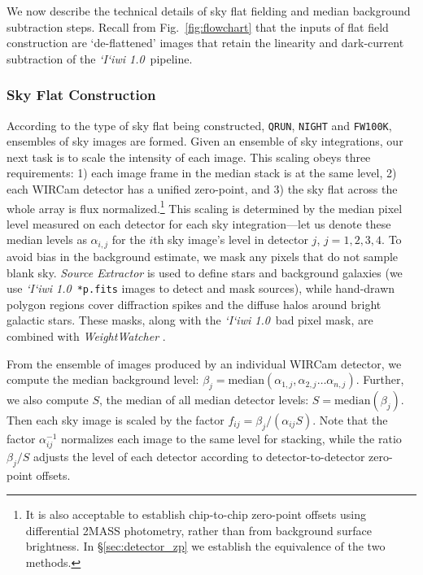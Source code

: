 \documentclass[iop]{emulateapj}
\newcommand{\sw}[1]{\textit{#1}} %
\newcommand{\iiwione}{\sw{`I`iwi 1.0}}
\newcommand{\Fig}[1]{Fig.~\ref{fig:#1}}  %
\newcommand{\Sec}[1]{\S\ref{sec:#1}}  %
\begin{document}
We now describe the technical details of sky flat fielding and median background subtraction steps.
Recall from \Fig{flowchart} that the inputs of flat field construction are `de-flattened' images that retain the linearity and dark-current subtraction of the \iiwione\ pipeline.

\subsubsection{Sky Flat Construction}
\label{sec:skyflatconstruction}

According to the type of sky flat being constructed, \texttt{QRUN}, \texttt{NIGHT} and \texttt{FW100K}, ensembles of sky images are formed.
Given an ensemble of sky integrations, our next task is to scale the intensity of each image.
This scaling obeys three requirements: 1) each image frame in the median stack is at the same level, 2) each WIRCam detector has a unified zero-point, and 3) the sky flat across the whole array is flux normalized.\footnote{It is also acceptable to establish chip-to-chip zero-point offsets using differential 2MASS photometry, rather than from background surface brightness. In \Sec{detector_zp} we establish the equivalence of the two methods.}
This scaling is determined by the median pixel level measured on each detector for each sky integration---let us denote these median levels as $\alpha_{i,j}$ for the $i$th sky image's level in detector $j$, $j=1, 2, 3, 4$.
To avoid bias in the background estimate, we mask any pixels that do not sample blank sky.
\sw{Source Extractor} \citep{Bertin:1996} is used to define stars and background galaxies (we use \iiwione\ \texttt{*p.fits} images to detect and mask sources), while hand-drawn polygon regions cover diffraction spikes and the diffuse halos around bright galactic stars. These masks, along with the \iiwione\ bad pixel mask, are combined with \sw{WeightWatcher} \citep{Marmo:2008}.

From the ensemble of images produced by an individual WIRCam detector, we compute the median background level: $\beta_j = \mathrm{median}(\alpha_{1,j}, \alpha_{2,j}\ldots \alpha_{n,j} )$.
Further, we also compute $S$, the median of all median detector levels: $S=\mathrm{median}(\beta_j)$.
Then each sky image is scaled by the factor $f_{ij} = \beta_j / (\alpha_{ij} S)$.
Note that the factor $\alpha_{ij}^{-1}$ normalizes each image to the same level for stacking, while the ratio $\beta_j / S$ adjusts the level of each detector according to detector-to-detector zero-point offsets.
\end{document}
